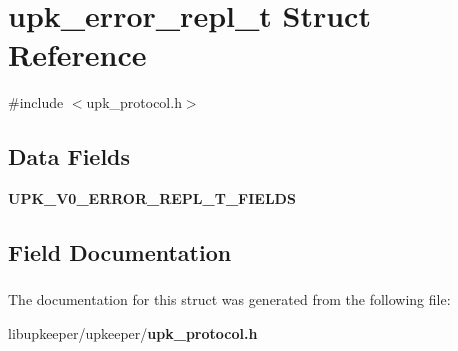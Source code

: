 \section{upk\_\-error\_\-repl\_\-t Struct Reference}
\label{structupk__error__repl__t}


{\ttfamily \#include $<$upk\_\-protocol.h$>$}

\subsection*{Data Fields}
\begin{DoxyCompactItemize}
\item 
{\bf UPK\_\-V0\_\-ERROR\_\-REPL\_\-T\_\-FIELDS}
\end{DoxyCompactItemize}


\subsection{Field Documentation}
\subsubsection[{UPK\_\-V0\_\-ERROR\_\-REPL\_\-T\_\-FIELDS}]{}\label{structupk__error__repl__t_ac983db656c6f6dcb847542ce01259414}


The documentation for this struct was generated from the following file:\begin{DoxyCompactItemize}
\item 
libupkeeper/upkeeper/{\bf upk\_\-protocol.h}\end{DoxyCompactItemize}
